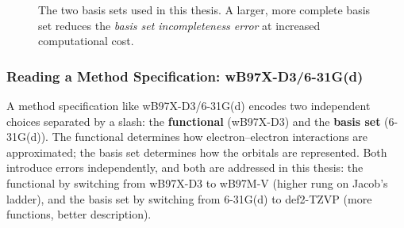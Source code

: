 \begin{figure}[h]
\centering
{}
\caption{The two basis sets used in this thesis. A larger, more complete basis
set reduces the \emph{basis set incompleteness error} at increased computational
cost.}
\label{fig:basis-sets}
\end{figure}

\subsubsection{Reading a Method Specification: wB97X-D3/6-31G(d)}

A method specification like \mbox{wB97X-D3/6-31G(d)} encodes two independent
choices separated by a slash: the \textbf{functional} (wB97X-D3) and the
\textbf{basis set} (6-31G(d)). The functional determines how electron--electron
interactions are approximated; the basis set determines how the orbitals are
represented. Both introduce errors independently, and both are addressed in this
thesis: the functional by switching from wB97X-D3 to wB97M-V (higher rung on
Jacob's ladder), and the basis set by switching from 6-31G(d) to def2-TZVP
(more functions, better description).

